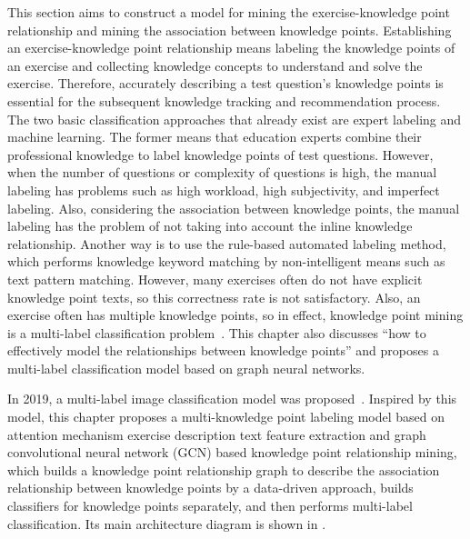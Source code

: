 This section aims to construct a model for mining the exercise-knowledge point relationship and mining the association between knowledge points. Establishing an exercise-knowledge point relationship means labeling the knowledge points of an exercise and collecting knowledge concepts to understand and solve the exercise. Therefore, accurately describing a test question's knowledge points is essential for the subsequent knowledge tracking and recommendation process. The two basic classification approaches that already exist are expert labeling and machine learning. The former means that education experts combine their professional knowledge to label knowledge points of test questions. However, when the number of questions or complexity of questions is high, the manual labeling has problems such as high workload, high subjectivity, and imperfect labeling. Also, considering the association between knowledge points, the manual labeling has the problem of not taking into account the inline knowledge relationship. Another way is to use the rule-based automated labeling method, which performs knowledge keyword matching by non-intelligent means such as text pattern matching. However, many exercises often do not have explicit knowledge point texts, so this correctness rate is not satisfactory. Also, an exercise often has multiple knowledge points, so in effect, knowledge point mining is a multi-label classification problem~\cite{tsoumakas2007multi,zhang2013review,liu2020emerging}. This chapter also discusses ``how to effectively model the relationships between knowledge points'' and proposes a multi-label classification model based on graph neural networks.



In 2019, a multi-label image classification model was proposed~\cite{chen2019multi}. Inspired by this model, this chapter proposes a multi-knowledge point labeling model based on attention mechanism exercise description text feature extraction and graph convolutional neural network (GCN) based knowledge point relationship mining, which builds a knowledge point relationship graph to describe the association relationship between knowledge points by a data-driven approach, builds classifiers for knowledge points separately, and then performs multi-label classification. Its main architecture diagram is shown in \figname{\ref{fig:ch2-modelarchitecture}}.


